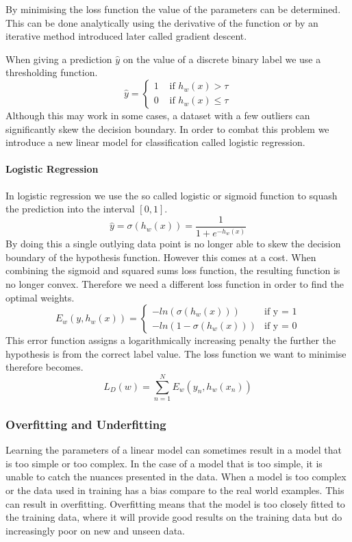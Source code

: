 By minimising the loss function the value of the parameters can be determined.
This can be done analytically using the derivative of the function or by an iterative method introduced later called gradient descent.

When giving a prediction $\hat{y}$ on the value of a discrete binary label we use a thresholding function.
\[
\hat{y} = 
\begin{cases}
  1 &\text{ if } h_w(x) > \tau \\
  0 &\text{ if } h_w(x) \leq \tau  %
\end{cases}
\] 
Although this may work in some cases, a dataset with a few outliers can significantly skew the decision boundary.
In order to combat this problem we introduce a new linear model for classification called logistic regression.

\paragraph{Logistic Regression}\label{sec:logistic}

In logistic regression we use the so called logistic or sigmoid function to squash the prediction into the interval $[0,1]$.
\[ \hat{y} = \sigma(h_w(x)) = \frac{1}{1+e^{-h_w(x)}} \]
By doing this a single outlying data point is no longer able to skew the decision boundary of the hypothesis function.
However this comes at a cost.
When combining the sigmoid and squared sums loss function, the resulting function is no longer convex.
Therefore we need a different loss function in order to find the optimal weights.
\[E_w(y,h_w(x)) = \begin{cases}
	-ln(\sigma(h_w(x))) &\text{if y = 1}\\	
	-ln(1-\sigma(h_w(x))) &\text{if y = 0}
\end{cases}\]
This error function assigns a logarithmically increasing penalty the further the hypothesis is from the correct label value.
The loss function we want to minimise therefore becomes. 
$$L_D(w) = \sum_{n=1}^N E_w(y_n, h_w(x_n))$$ 

\subsubsection{Overfitting and Underfitting}
Learning the parameters of a linear model can sometimes result in a model that is too simple or too complex.
In the case of a model that is too simple, it is unable to catch the nuances presented in the data.
When a model is too complex or the data used in training has a bias compare to the real world examples.
This can result in overfitting.
Overfitting means that the model is too closely fitted to the training data, where it will provide good results on the training data but do increasingly poor on new and unseen data.

